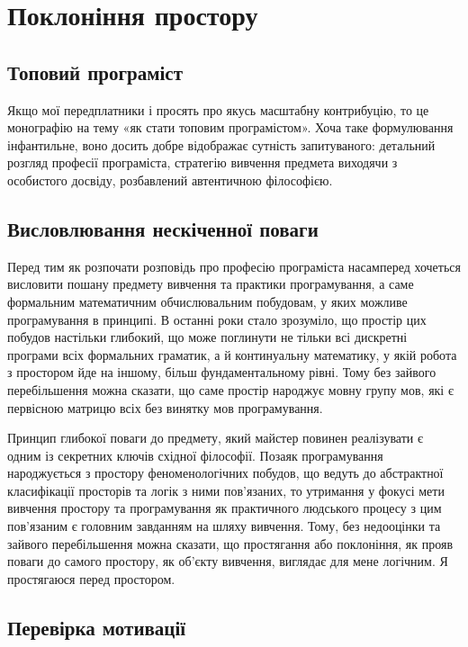 \section{Поклоніння простору}

\subsection{Топовий програміст}

Якщо мої передплатники і просять про якусь масштабну контрибуцію,
то це монографію на тему «як стати топовим програмістом».
Хоча таке формулювання інфантильне, воно досить добре
відображає сутність запитуваного: детальний розгляд професії
програміста, стратегію вивчення предмета виходячи з особистого
досвіду, розбавлений автентичною філософією.

\subsection{Висловлювання нескіченної поваги}

Перед тим як розпочати розповідь про професію програміста
насамперед хочеться висловити пошану предмету вивчення та
практики програмування, а саме формальним математичним
обчислювальним побудовам, у яких можливе програмування
в принципі. В останні роки стало зрозуміло, що простір
цих побудов настільки глибокий, що може поглинути не
тільки всі дискретні програми всіх формальних граматик,
а й континуальну математику, у якій робота з простором
йде на іншому, більш фундаментальному рівні. Тому без зайвого
перебільшення можна сказати, що саме простір народжує
мовну групу мов, які є первісною матрицю всіх без винятку
мов програмування.

Принцип глибокої поваги до предмету, який
майстер повинен реалізувати є одним із секретних ключів
східної філософії. Позаяк програмування народжується з
простору феноменологічних побудов, що ведуть до абстрактної
класифікації просторів та логік з ними пов'язаних, то утримання
у фокусі мети вивчення простору та програмування як
практичного людського процесу з цим пов'язаним є
головним завданням на шляху вивчення. Тому, без недооцінки та
зайвого перебільшення можна сказати, що простягання або поклоніння,
як прояв поваги до самого простору, як об'єкту вивчення,
виглядає для мене логічним. Я простягаюся перед простором.

\subsection{Перевірка мотивації}


